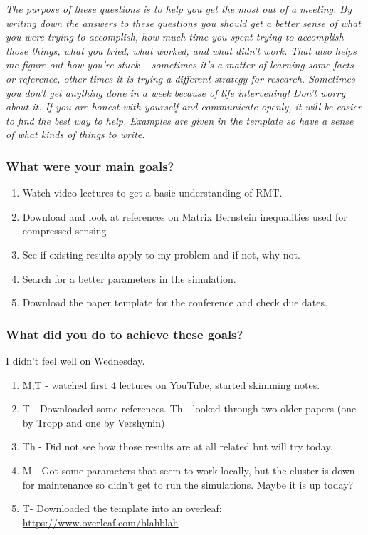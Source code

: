 \documentclass[10pt, letter]{article}
\begin{document}


\noindent \textit{The purpose of these questions is to help you get the most out of a meeting. By writing down the answers to these questions you should get a better sense of what you were trying to accomplish, how much time you spent trying to accomplish those things, what you tried, what worked, and what didn't work.  That also helps me figure out how you're stuck -- sometimes it's a matter of learning some facts or reference, other times it is trying a different strategy for research.  Sometimes you don't get anything done in a week because of life intervening!  Don't worry about it. If you are honest with yourself and communicate openly, it will be easier to find the best way to help. Examples are given in the template so have a sense of what kinds of things to write.}


\subsubsection*{What were your main goals?}

\begin{note}
	\begin{enumerate}
	\item Watch video lectures to get a basic understanding of RMT.
	\item Download and look at references on Matrix Bernstein inequalities used for compressed sensing 
	\item See if existing results apply to my problem and if not, why not.
	\item Search for a better parameters in the simulation.
	\item Download the paper template for the conference and check due dates.
	\end{enumerate}
\end{note}


\subsubsection*{What did you do to achieve these goals?}

\begin{note}
I didn't feel well on Wednesday.
	\begin{enumerate}
	\item M,T - watched first 4 lectures on YouTube, started skimming notes.
	\item T - Downloaded some references. Th - looked through two older papers (one by Tropp and one by Vershynin)
	\item Th - Did not see how those results are at all related but will try today.
	\item M - Got some parameters that seem to work locally, but the cluster is down for maintenance so didn't get to run the simulations. Maybe it is up today?
	\item T- Downloaded the template into an overleaf: \url{https://www.overleaf.com/blahblah}
	\end{enumerate}
\end{note}
\end{document}
